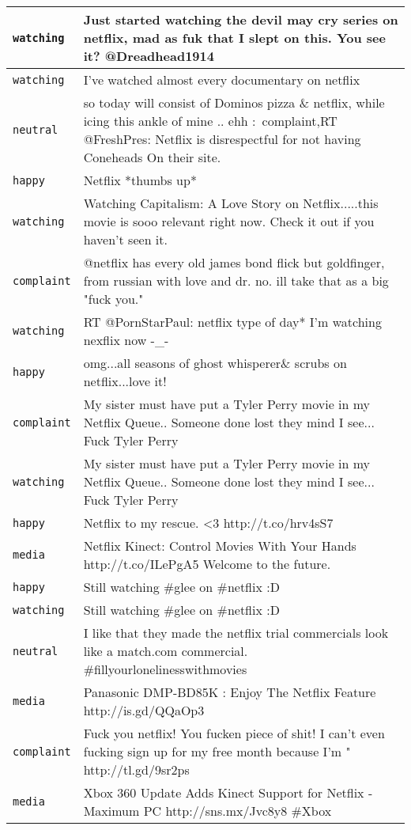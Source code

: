 {\begin{longtable}{|l|p{160mm}|}
         \texttt{watching} & Just started watching the devil may cry series on netflix, mad as fuk that I slept on this. You see it? @Dreadhead1914
      \tabularnewline\hline
         \texttt{watching} & I've watched almost every documentary on netflix
      \tabularnewline\hline
         \texttt{neutral} & so today will consist of Dominos pizza \& netflix, while icing this ankle of mine .. ehh :\ complaint,RT @FreshPres: Netflix is disrespectful for not having Coneheads On their site.
      \tabularnewline\hline
         \texttt{happy} & Netflix *thumbs up*
      \tabularnewline\hline
         \texttt{watching} & Watching Capitalism: A Love Story on Netflix.....this movie is sooo relevant right now. Check it out if you haven't seen it.
      \tabularnewline\hline
         \texttt{complaint} & @netflix has every old james bond flick but goldfinger, from russian with love and dr. no. ill take that as a big "fuck you."
      \tabularnewline\hline
         \texttt{watching} & RT @PornStarPaul: netflix type of day* I'm watching nexflix now -\_-
      \tabularnewline\hline
         \texttt{happy} & omg...all seasons of ghost whisperer\& scrubs on netflix...love it!
      \tabularnewline\hline
         \texttt{complaint} & My sister must have put a Tyler Perry movie in my Netflix Queue.. Someone done lost they mind I see... Fuck Tyler Perry
      \tabularnewline\hline
         \texttt{watching} & My sister must have put a Tyler Perry movie in my Netflix Queue.. Someone done lost they mind I see... Fuck Tyler Perry
      \tabularnewline\hline
         \texttt{happy} & Netflix to my rescue. <3 http://t.co/hrv4sS7
      \tabularnewline\hline
         \texttt{media} & Netflix Kinect: Control Movies With Your Hands http://t.co/ILePgA5 Welcome to the future.
      \tabularnewline\hline
         \texttt{happy} & Still watching \#glee on \#netflix :D
      \tabularnewline\hline
         \texttt{watching} & Still watching \#glee on \#netflix :D
      \tabularnewline\hline
         \texttt{neutral} & I like that they made the netflix trial commercials look like a match.com commercial. \#fillyourlonelinesswithmovies
      \tabularnewline\hline
         \texttt{media} & Panasonic DMP-BD85K : Enjoy The Netflix Feature http://is.gd/QQaOp3
      \tabularnewline\hline
         \texttt{complaint} & Fuck you netflix! You fucken piece of shit! I can't even fucking sign up for my free month because I'm " http://tl.gd/9sr2ps
      \tabularnewline\hline
         \texttt{media} & Xbox 360 Update Adds Kinect Support for Netflix - Maximum PC http://sns.mx/Jvc8y8 \#Xbox
      \tabularnewline\hline

\end{longtable}}
